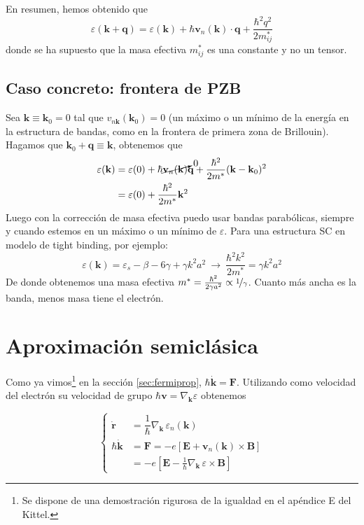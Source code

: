En resumen, hemos obtenido que
\begin{equation}
  \varepsilon (\mathbf{k} + \mathbf{q}) = \varepsilon(\mathbf{k}) +
  \hbar \mathbf{v}_n (\mathbf{k}) \cdot \mathbf{q} + \frac{\hbar^2 {q^2}}{2m_{ij}^*}
\end{equation}
donde se ha supuesto que la masa efectiva $m_{ij}^*$ es una constante y no un tensor.
\subsection{Caso concreto: frontera de PZB}
Sea $\mathbf{k} \equiv \mathbf{k}_0 = 0 $ tal que $ v_{n \mathbf{k}}
(\mathbf{k}_0)= 0$ (un máximo o un mínimo de la energía en la
estructura de bandas, como en la frontera de primera zona de
Brillouin). Hagamos que $\mathbf{k}_0 + \mathbf{q} \equiv \mathbf{k}$,
obtenemos que
\begin{equation}
  \begin{split}
    \varepsilon (\mathbf{k}) &= \varepsilon(0) + \hbar
    \cancelto{0}{\mathbf{v}_n (\mathbf{k})} \mathbf{q} +
    \frac{\hbar^2}{2m^*}(\mathbf{k}-\mathbf{k}_0)^2 \\
&= \varepsilon(0) + \frac{\hbar^2}{2m^*} \mathbf{k}^2
  \end{split}
\end{equation}
Luego con la corrección de masa efectiva puedo usar bandas
parabólicas, siempre y cuando estemos en un máximo o un mínimo de
$\varepsilon$. Para una estructura SC en modelo de tight binding, por
ejemplo:
\begin{equation}
  \varepsilon (\mathbf{k}) = \varepsilon_s - \beta - 6\gamma + \gamma
  k^2 a^2 \ \rightarrow \ \frac{\hbar^2 k^2}{2m^*} = \gamma k^2 a^2
\end{equation}
De donde obtenemos una masa efectiva $m^* = \frac{\hbar^2}{2 \gamma
  a^2} \propto \nicefrac{1}{\gamma}$. Cuanto más ancha es la banda,
menos masa tiene el electrón.

\section{Aproximación semiclásica}
Como ya vimos\footnote{Se dispone de una demostración rigurosa de la
  igualdad en el apéndice E del Kittel.} en la sección \ref{sec:fermiprop}, $ \hbar
\dot{\mathbf{k}}  = \mathbf{F}$. Utilizando como velocidad del
electrón su velocidad de grupo $\hbar \mathbf{v} =
\nabla_\mathbf{k}\varepsilon$ obtenemos

\begin{equation}
  \begin{cases}
    \dot{ \mathbf{r} } &= \dfrac{1}{\hbar} \nabla _\mathbf{k} \,
    \varepsilon_n (\mathbf{k}) \\
    \hbar \dot{\mathbf{k}} &= \mathbf{F} = -e [\mathbf{E} +
    \mathbf{v}_n (\mathbf{k}) \times \mathbf{B}] \\
    &= - e [\mathbf{E} - \frac{1}{\hbar} \nabla_\mathbf{k} \, \varepsilon
    \times \mathbf{B}]
  \end{cases}
\end{equation}

